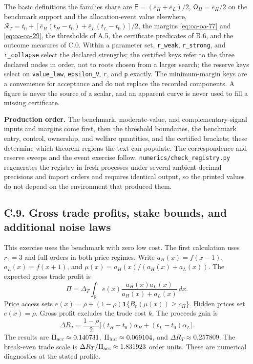 \documentclass[
  11pt,
]{article}
\begin{document}
The basic definitions the families share are
\(\mathsf E=(\bar e_H+\bar e_L)/2\), \(\mathsf O_H=\bar e_H/2\) on the
benchmark support and the allocation-event value elsewhere,
\(\mathcal R_T=t_0+[\bar e_H(t_H-t_0)+\bar e_L(t_L-t_0)]/2\), the
margins \eqref{eq:oa-oa-77} and \eqref{eq:oa-oa-29}, the thresholds of
A.5, the certificate predicates of B.6, and the outcome measures of C.0.
Within a parameter set, \texttt{r\_weak}, \texttt{r\_strong}, and
\texttt{r\_collapse} select the declared strengths; the certified keys
refer to the three declared nodes in order, not to roots chosen from a
larger search; the reserve keys select on \texttt{value\_law},
\texttt{epsilon\_V}, \texttt{r}, and \texttt{p} exactly. The
minimum-margin keys are a convenience for acceptance and do not replace
the recorded components. A figure is never the source of a scalar, and
an apparent curve is never used to fill a missing certificate.

\textbf{Production order.} The benchmark, moderate-value, and
complementary-signal inputs and margins come first, then the threshold
boundaries, the benchmark entry, control, ownership, and welfare
quantities, and the certified brackets; these determine which theorem
regions the text can populate. The correspondence and reserve sweeps and
the event exercise follow. \texttt{numerics/check\_registry.py}
regenerates the registry in fresh processes under several ambient
decimal precisions and import orders and requires identical output, so
the printed values do not depend on the environment that produced them.

\subsection{C.9. Gross trade profits, stake bounds, and additional noise
laws}\label{oa-c-revision}

This exercise uses the benchmark with zero low cost. The first
calculation uses \(r_1=3\) and full orders in both price regimes. Write
\(a_H(x)=f(x-1)\), \(a_L(x)=f(x+1)\), and
\(\mu(x)=a_H(x)/(a_H(x)+a_L(x))\). The expected gross trade profit is \[
\Pi=\Delta_T\int_{\mathbb R}e(x)\frac{a_H(x)a_L(x)}{a_H(x)+a_L(x)}\,dx.
\] Price access sets
\(e(x)=\rho+(1-\rho)\mathbf 1\{B_r(\mu(x))\ge c_H\}\). Hidden prices set
\(e(x)=\rho\). Gross profit excludes the trade cost \(k\). The proceeds
gain is \[
\Delta R_T=\frac{1-\rho}{2}\big[(t_H-t_0)\alpha_H+(t_L-t_0)\alpha_L\big].
\] The results are \(\Pi_{\rm acc}\approx0.140731\),
\(\Pi_{\rm hid}\approx0.069104\), and \(\Delta R_T\approx0.257809\). The
break-even trade scale is \(\Delta R_T/\Pi_{\rm acc}\approx1.831923\)
order units. These are numerical diagnostics at the stated profile.
\end{document}
